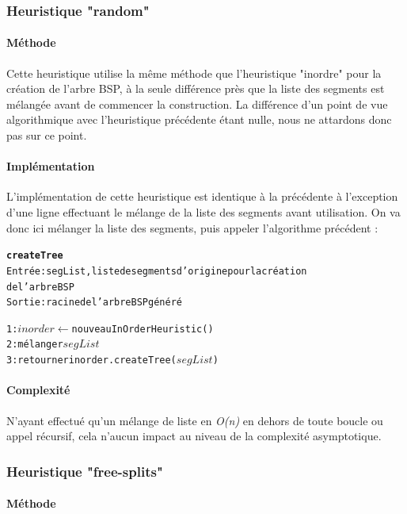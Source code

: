 \documentclass[11pt,a4paper]{article}
\theoremstyle{definition}
\theoremstyle{remark}
\begin{document}
\subsubsection{Heuristique "random"}

\paragraph{Méthode}

Cette heuristique utilise la même méthode que l'heuristique "inordre" pour la création de l'arbre BSP, à la seule différence près que la liste des segments est mélangée avant de commencer la construction. La différence d'un point de vue algorithmique avec l'heuristique précédente étant nulle, nous ne attardons donc pas sur ce point. 

\paragraph{Implémentation}

L'implémentation de cette heuristique est identique à la précédente à l'exception d'une ligne effectuant le mélange de la liste des segments avant utilisation. On va donc ici mélanger la liste des segments, puis appeler l'algorithme précédent :

\begin{alltt}
\textbf{createTree}
Entrée : segList, liste de segments d'origine pour la création 
de l'arbre BSP
Sortie : racine de l'arbre BSP généré

1: \(inorder \leftarrow\) nouveau InOrderHeuristic()
2: mélanger \(segList\)
3: retourner inorder.createTree(\(segList\))
\end{alltt}

\paragraph{Complexité}

N'ayant effectué qu'un mélange de liste en \emph{O(n)} en dehors de toute boucle ou appel récursif, cela n'aucun impact au niveau de la complexité asymptotique. 

\subsubsection{Heuristique "free-splits"}

\paragraph{Méthode}
\end{document}
